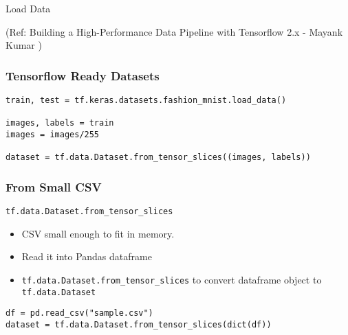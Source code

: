 \begin{frame}
  \begin{center}
    {\Large Load Data}
	
	{\tiny (Ref: Building a High-Performance Data Pipeline with Tensorflow 2.x - Mayank Kumar )}
  \end{center}
\end{frame}

\begin{frame}[fragile]\frametitle{Tensorflow Ready Datasets}
\begin{lstlisting}
train, test = tf.keras.datasets.fashion_mnist.load_data()

images, labels = train
images = images/255

dataset = tf.data.Dataset.from_tensor_slices((images, labels))
\end{lstlisting}
\end{frame}

\begin{frame}[fragile]\frametitle{From Small CSV}
\lstinline|tf.data.Dataset.from_tensor_slices|

\begin{itemize}
\item CSV small enough to fit in memory.
\item Read it into Pandas dataframe
\item \lstinline|tf.data.Dataset.from_tensor_slices| to convert dataframe object to \lstinline|tf.data.Dataset|
\end{itemize}

\begin{lstlisting}
df = pd.read_csv("sample.csv")
dataset = tf.data.Dataset.from_tensor_slices(dict(df))
\end{lstlisting}
\end{frame}

